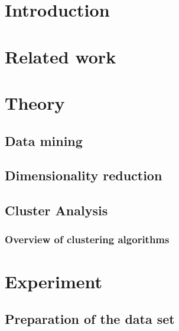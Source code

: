 \section{Introduction}
\label{section:Introduction}




\section{Related work}
\label{section:RelatedWork}




\section{Theory}
\label{section:Theory}


  \subsection{Data mining}
  \label{section:TheoryDataMining}
  

  \subsection{Dimensionality reduction}
  \label{section:TheoryDimensionalityReduction}
  
  
  \subsection{Cluster Analysis}
  \label{section:TheoryClusterAnalysis}
  

    \subsubsection{Overview of clustering algorithms}
    \label{section:TheoryOverviewClusteringAlgorithms}
    




\section{Experiment}
\label{section:Experiment}


  \subsection{Preparation of the data set}
  \label{section:ExperimentPreparationDataSet}
  

